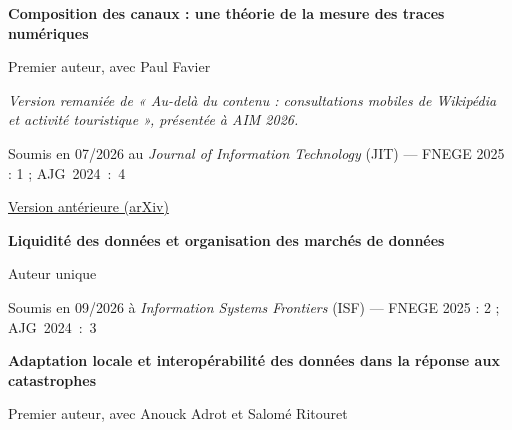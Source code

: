 \documentclass[11pt,a4paper]{article}
\newlength{\cvindent}
\newenvironment{cvblock}[1][1]{%
  \par\noindent\hspace*{#1\cvindent}%
  \begin{minipage}{\dimexpr\linewidth-#1\cvindent\relax}%
}{%
  \end{minipage}\par
}
\newenvironment{cvdetails}{%
  \begin{list}{}{%
    \setlength{\leftmargin}{\cvindent}%
    \setlength{\rightmargin}{0pt}%
    \setlength{\topsep}{0.1em}%
    \setlength{\partopsep}{0pt}%
    \setlength{\parsep}{0.05em}%
    \setlength{\itemsep}{0pt}%
  }\item[]\small\ignorespaces
}{%
  \end{list}
}
\begin{document}
\begin{cvblock}[2]
\textbf{Composition des canaux : une théorie de la mesure des traces numériques}\par
\begin{cvdetails}
{\small Premier auteur, avec Paul Favier}\par
\vspace{0.3em}
{\small\itshape Version remaniée de « Au-delà du contenu : consultations mobiles de Wikipédia et activité touristique », présentée à AIM 2026.}\par
{\small Soumis en 07/2026 au \textit{Journal of Information Technology} (JIT) --- FNEGE 2025 : 1 ; \mbox{AJG 2024 : 4}}\par
\href{https://arxiv.org/abs/2606.29991}{Version antérieure (arXiv)}\par
\end{cvdetails}
\end{cvblock}\par\vspace{0.35em}

\begin{cvblock}[2]
\textbf{Liquidité des données et organisation des marchés de données}\par
\begin{cvdetails}
{\small Auteur unique}\par
{\small Soumis en 09/2026 à \textit{Information Systems Frontiers} (ISF) --- FNEGE 2025 : 2 ; \mbox{AJG 2024 : 3}}\par
\end{cvdetails}
\end{cvblock}\par\vspace{0.35em}

\begin{cvblock}[2]
\textbf{Adaptation locale et interopérabilité des données dans la réponse aux catastrophes}\par
\begin{cvdetails}
{\small Premier auteur, avec Anouck Adrot et Salomé Ritouret}\par
\end{cvdetails}
\end{cvblock}\par\vspace{0.35em}
\end{document}

